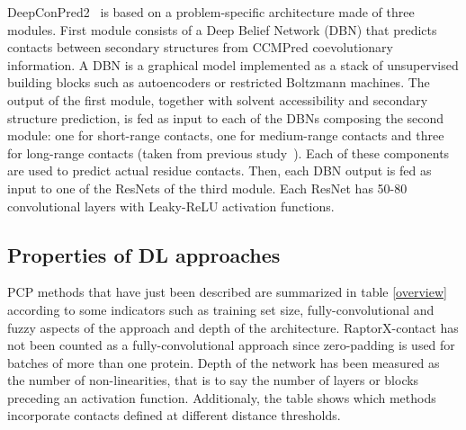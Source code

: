         DeepConPred2~\cite{DeepConPred2} is based on a problem-specific architecture made
        of three modules. First module consists of a Deep Belief Network (DBN) that predicts
        contacts between secondary structures from CCMPred coevolutionary information.
        A DBN is a graphical model implemented as
        a stack of unsupervised building blocks such as autoencoders or
        restricted Boltzmann machines.
        The output of the first module, together with solvent accessibility and secondary
        structure prediction, is fed as input to each of the DBNs composing
        the second module: one for short-range contacts, one for medium-range contacts
        and three for long-range contacts (taken from previous study~\cite{xiong2017deep}).
        Each of these components are used to predict actual residue contacts.
        Then, each DBN output is fed as input to one of the ResNets of the third module.
        Each ResNet has 50-80 convolutional layers with Leaky-ReLU activation functions.

    \subsection{Properties of DL approaches}

        PCP methods that have just been described are summarized in table \ref{overview}
        according to some indicators such as training set size, fully-convolutional and fuzzy
        aspects of the approach and depth of the architecture. RaptorX-contact has not been
        counted as a fully-convolutional approach since zero-padding is used for batches of
        more than one protein. Depth of the network has been measured as the number of non-linearities,
        that is to say the number of layers or blocks preceding an activation function.
        Additionaly, the table shows which methods incorporate contacts defined at different distance
        thresholds.

